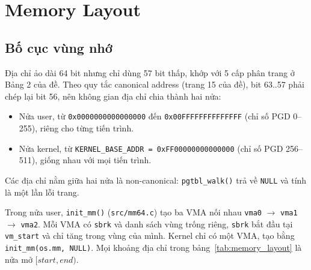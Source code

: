 \documentclass[12pt,a4paper]{article}
\begin{document}
	\section{Memory Layout}

	\subsection{Bố cục vùng nhớ}
	Địa chỉ ảo dài 64 bit nhưng chỉ dùng 57 bit thấp, khớp với 5 cấp phân trang ở Bảng 2 của đề. Theo quy tắc canonical address (trang 15 của đề), bit 63..57 phải chép lại bit 56, nên không gian địa chỉ chia thành hai nửa:
	\begin{itemize}
	    \item Nửa user, từ \texttt{0x0000000000000000} đến \texttt{0x00FFFFFFFFFFFFFF} (chỉ số PGD 0--255), riêng cho từng tiến trình.
	    \item Nửa kernel, từ \texttt{KERNEL\_BASE\_ADDR = 0xFF00000000000000} (chỉ số PGD 256--511), giống nhau với mọi tiến trình.
	\end{itemize}
	Các địa chỉ nằm giữa hai nửa là non-canonical: \texttt{pgtbl\_walk()} trả về \texttt{NULL} và tính là một lần lỗi trang.

	Trong nửa user, \texttt{init\_mm()} (\texttt{src/mm64.c}) tạo ba VMA nối nhau \texttt{vma0} $\rightarrow$ \texttt{vma1} $\rightarrow$ \texttt{vma2}. Mỗi VMA có \texttt{sbrk} và danh sách vùng trống riêng, \texttt{sbrk} bắt đầu tại \texttt{vm\_start} và chỉ tăng trong vùng của mình. Kernel chỉ có một VMA, tạo bằng \texttt{init\_mm(os.mm, NULL)}. Mọi khoảng địa chỉ trong bảng~\ref{tab:memory_layout} là nửa mở \([start, end)\).
\end{document}
